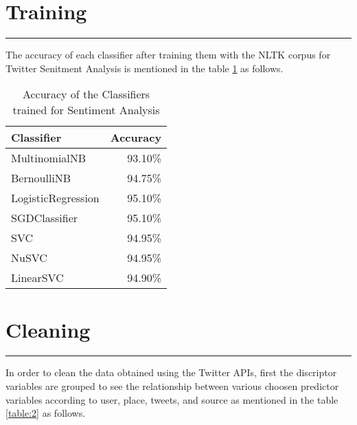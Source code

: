 \documentclass[a4paper,12pt, notitlepage]{article}
\begin{document}
\section{Training}
\rule{\textwidth}{0.5pt}
\par
The accuracy of each classifier after training them with the NLTK corpus for Twitter Senitment Analysis is mentioned in the table \ref{table:1} as follows.

\begin{table}[!htbp]
\centering
\begin{tabular}{ |l|r| } 
\hline \rowcolor{Gray}
Classifier & Accuracy   \\[1ex]
\hline
MultinomialNB & 93.10\%   \\[1ex] 
BernoulliNB & 94.75\%  \\[1ex] 
LogisticRegression & 95.10\% \\[1ex] 
SGDClassifier & 95.10\% \\[1ex] 
SVC & 94.95\% \\[1ex] 
NuSVC & 94.95\% \\[1ex] 
LinearSVC & 94.90\% \\[1ex] 
\hline
\end{tabular}
\caption{Accuracy of the Classifiers trained for Sentiment Analysis}
\label{table:1}
\end{table}

\section{Cleaning}
\rule{\textwidth}{0.5pt}
\par
In order to clean the data obtained using the Twitter APIs, first the discriptor variables are grouped to see the relationship between various choosen predictor variables according to user, place, tweets, and source as mentioned in the table \ref{table:2} as follows.
\end{document}
